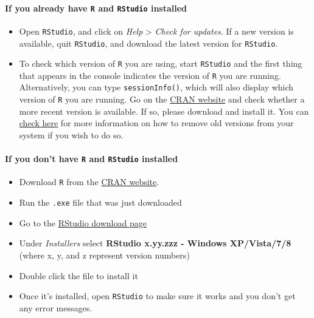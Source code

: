 \documentclass[
]{article}
\providecommand{\tightlist}{%
  \setlength{\itemsep}{0pt}\setlength{\parskip}{0pt}}
\begin{document}
\paragraph{\texorpdfstring{If you already have \texttt{R} and
\texttt{RStudio}
installed}{If you already have R and RStudio installed}}\label{if-you-already-have-r-and-rstudio-installed}

\begin{itemize}
\tightlist
\item
  Open \texttt{RStudio}, and click on \emph{Help} \textgreater{}
  \emph{Check for updates}. If a new version is available, quit
  \texttt{RStudio}, and download the latest version for
  \texttt{RStudio}.
\item
  To check which version of \texttt{R} you are using, start
  \texttt{RStudio} and the first thing that appears in the console
  indicates the version of \texttt{R} you are running. Alternatively,
  you can type \texttt{sessionInfo()}, which will also display which
  version of \texttt{R} you are running. Go on the
  \href{https://cran.r-project.org/bin/windows/base/}{CRAN website} and
  check whether a more recent version is available. If so, please
  download and install it. You can
  \href{https://cran.r-project.org/bin/windows/base/rw-FAQ.html\#How-do-I-UNinstall-R_003f}{check
  here} for more information on how to remove old versions from your
  system if you wish to do so.
\end{itemize}

\paragraph{\texorpdfstring{If you don't have \texttt{R} and
\texttt{RStudio}
installed}{If you don't have R and RStudio installed}}\label{if-you-dont-have-r-and-rstudio-installed}

\begin{itemize}
\tightlist
\item
  Download \texttt{R} from the
  \href{http://cran.r-project.org/bin/windows/base/release.htm}{CRAN
  website}.
\item
  Run the \texttt{.exe} file that was just downloaded
\item
  Go to the
  \href{https://www.rstudio.com/products/rstudio/download/\#download}{RStudio
  download page}
\item
  Under \emph{Installers} select \textbf{RStudio x.yy.zzz - Windows
  XP/Vista/7/8} (where x, y, and z represent version numbers)
\item
  Double click the file to install it
\item
  Once it's installed, open \texttt{RStudio} to make sure it works and
  you don't get any error messages.
\end{itemize}
\end{document}
